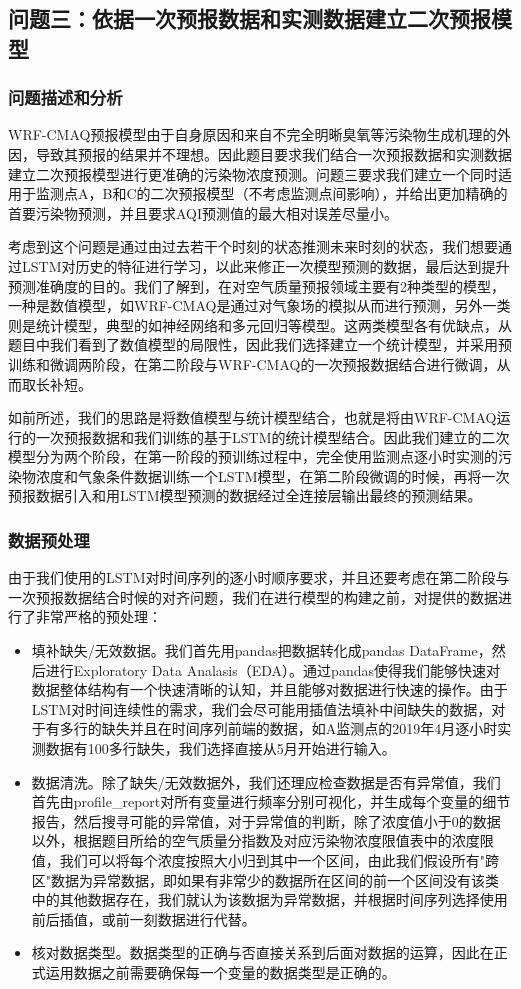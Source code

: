 \documentclass[bwprint]{gmcmthesis}
\numberwithin{figure}{section}
\begin{document}
\subsection{问题三：依据一次预报数据和实测数据建立二次预报模型}
\subsubsection{问题描述和分析}
WRF-CMAQ预报模型由于自身原因和来自不完全明晰臭氧等污染物生成机理的外因，导致其预报的结果并不理想。因此题目要求我们结合一次预报数据和实测数据建立二次预报模型进行更准确的污染物浓度预测。问题三要求我们建立一个同时适用于监测点A，B和C的二次预报模型（不考虑监测点间影响），并给出更加精确的首要污染物预测，并且要求AQI预测值的最大相对误差尽量小。

考虑到这个问题是通过由过去若干个时刻的状态推测未来时刻的状态，我们想要通过LSTM对历史的特征进行学习，以此来修正一次模型预测的数据，最后达到提升预测准确度的目的。我们了解到，在对空气质量预报领域主要有2种类型的模型，一种是数值模型，如WRF-CMAQ是通过对气象场的模拟从而进行预测，另外一类则是统计模型，典型的如神经网络和多元回归等模型。这两类模型各有优缺点，从题目中我们看到了数值模型的局限性，因此我们选择建立一个统计模型，并采用预训练和微调两阶段，在第二阶段与WRF-CMAQ的一次预报数据结合进行微调，从而取长补短。

如前所述，我们的思路是将数值模型与统计模型结合，也就是将由WRF-CMAQ运行的一次预报数据和我们训练的基于LSTM的统计模型结合。因此我们建立的二次模型分为两个阶段，在第一阶段的预训练过程中，完全使用监测点逐小时实测的污染物浓度和气象条件数据训练一个LSTM模型，在第二阶段微调的时候，再将一次预报数据引入和用LSTM模型预测的数据经过全连接层输出最终的预测结果。
\subsubsection{数据预处理}
由于我们使用的LSTM对时间序列的逐小时顺序要求，并且还要考虑在第二阶段与一次预报数据结合时候的对齐问题，我们在进行模型的构建之前，对提供的数据进行了非常严格的预处理：
\begin{itemize}
	\item 填补缺失/无效数据。我们首先用pandas把数据转化成pandas DataFrame，然后进行Exploratory Data Analasis（EDA）。通过pandas使得我们能够快速对数据整体结构有一个快速清晰的认知，并且能够对数据进行快速的操作。由于LSTM对时间连续性的需求，我们会尽可能用插值法填补中间缺失的数据，对于有多行的缺失并且在时间序列前端的数据，如A监测点的2019年4月逐小时实测数据有100多行缺失，我们选择直接从5月开始进行输入。
	\item 数据清洗。除了缺失/无效数据外，我们还理应检查数据是否有异常值，我们首先由profile_report对所有变量进行频率分别可视化，并生成每个变量的细节报告，然后搜寻可能的异常值，对于异常值的判断，除了浓度值小于0的数据以外，根据题目所给的空气质量分指数及对应污染物浓度限值表中的浓度限值，我们可以将每个浓度按照大小归到其中一个区间，由此我们假设所有"跨区"数据为异常数据，即如果有非常少的数据所在区间的前一个区间没有该类中的其他数据存在，我们就认为该数据为异常数据，并根据时间序列选择使用前后插值，或前一刻数据进行代替。
	\item 核对数据类型。数据类型的正确与否直接关系到后面对数据的运算，因此在正式运用数据之前需要确保每一个变量的数据类型是正确的。
\end{itemize}
\end{document}
